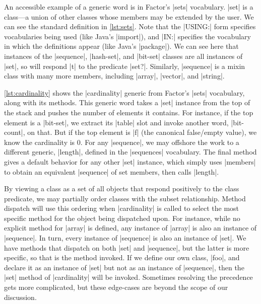 An accessible example of a generic word is in Factor's \factor|sets|
vocabulary.  \factor|set| is a  class---a union of other classes
whose members may be extended by the user.  We can see the standard definition
in \vref{lst:sets}.  Note that the \factor|USING:| form specifies vocabularies
being used (like Java's |import|), and \factor|IN:| specifies the
vocabulary in which the definitions appear (like Java's |package|).
We can see here that instances of the \factor|sequence|, \factor|hash-set|, and
\factor|bit-set| classes are all instances of \factor|set|, so will respond
\factor|t| to the predicate \factor|set?|.  Similarly, \factor|sequence| is a
mixin class with many more members, including \factor|array|, \factor|vector|,
and \factor|string|.


\vref{lst:cardinality} shows the \factor|cardinality| generic from Factor's
\factor|sets| vocabulary, along with its methods.  This generic word takes a
\factor|set| instance from the top of the stack and pushes the number of
elements it contains.  For instance, if the top element is a \factor|bit-set|,
we extract its \factor|table| slot and invoke another word, \factor|bit-count|,
on that.  But if the top element is \factor|f| (the canonical false/empty
value), we know the cardinality is $0$.  For any \factor|sequence|, we may
offshore the work to a different generic, \factor|length|, defined in the
\factor|sequences| vocabulary.  The final method gives a default behavior for
any other \factor|set| instance, which simply uses \factor|members| to obtain
an equivalent \factor|sequence| of set members, then calls \factor|length|.

By viewing a class as a set of all objects that respond positively to the class
predicate, we may partially order classes with the subset relationship.  Method
dispatch will use this ordering when \factor|cardinality| is called to select
the most specific method for the object being dispatched upon.  For instance,
while no explicit method for \factor|array| is defined, any instance of
\factor|array| is also an instance of \factor|sequence|.  In turn, every
instance of \factor|sequence| is also an instance of \factor|set|.  We have
methods that dispatch on both \factor|set| and \factor|sequence|, but the
latter is more specific, so that is the method invoked.  If we define our own
class, \factor|foo|, and declare it as an instance of \factor|set| but not as
an instance of \factor|sequence|, then the \factor|set| method of
\factor|cardinality| will be invoked.  Sometimes resolving the precedence gets
more complicated, but these edge-cases are beyond the scope of our discussion.
